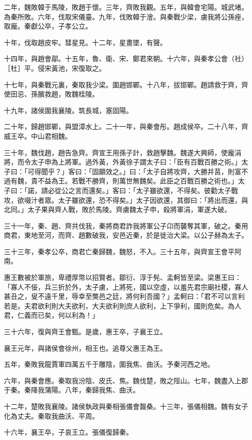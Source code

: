 \begin{pinyinscope}
二年，魏敗韓于馬陵，敗趙于懷。三年，齊敗我觀。五年，與韓會宅陽。城武堵。為秦所敗。六年，伐取宋儀臺。九年，伐敗韓于澮。與秦戰少梁，虜我將公孫痤，取龐。秦獻公卒，子孝公立。

十年，伐取趙皮牢。彗星見。十二年，星晝墜，有聲。

十四年，與趙會鄗。十五年，魯、衛、宋、鄭君來朝。十六年，與秦孝公會（社）［杜］平。侵宋黃池，宋復取之。

十七年，與秦戰元裏，秦取我少梁。圍趙邯鄲。十八年，拔邯鄲。趙請救于齊，齊使田忌、孫臏救趙，敗魏桂陵。

十九年，諸侯圍我襄陵。筑長城，塞固陽。

二十年，歸趙邯鄲，與盟漳水上。二十一年，與秦會彤。趙成侯卒。二十八年，齊威王卒。中山君相魏。

三十年，魏伐趙，趙告急齊。齊宣王用孫子計，救趙擊魏。魏遂大興師，使龐涓將，而令太子申為上將軍。過外黃，外黃徐子謂太子曰：「臣有百戰百勝之術。」太子曰：「可得聞乎？」客曰：「固願效之。」曰：「太子自將攻齊，大勝并莒，則富不過有魏，貴不益為王。若戰不勝齊，則萬世無魏矣。此臣之百戰百勝之術也。」太子曰：「諾，請必從公之言而還矣。」客曰：「太子雖欲還，不得矣。彼勸太子戰攻，欲啜汁者眾。太子雖欲還，恐不得矣。」太子因欲還，其御曰：「將出而還，與北同。」太子果與齊人戰，敗於馬陵。齊虜魏太子申，殺將軍涓，軍遂大破。

三十一年，秦、趙、齊共伐我，秦將商君詐我將軍公子卬而襲奪其軍，破之。秦用商君，東地至河，而齊、趙數破我，安邑近秦，於是徙治大梁。以公子赫為太子。

三十三年，秦孝公卒，商君亡秦歸魏，魏怒，不入。三十五年，與齊宣王會平阿南。

惠王數被於軍旅，卑禮厚幣以招賢者。鄒衍、淳于髡、孟軻皆至梁。梁惠王曰：「寡人不佞，兵三折於外，太子虜，上將死，國以空虛，以羞先君宗廟社稷，寡人甚丑之，叟不遠千里，辱幸至獘邑之廷，將何利吾國？」孟軻曰：「君不可以言利若是。夫君欲利則大夫欲利，大夫欲利則庶人欲利，上下爭利，國則危矣。為人君，仁義而已矣，何以利為！」

三十六年，復與齊王會甄。是歲，惠王卒，子襄王立。

襄王元年，與諸侯會徐州，相王也。追尊父惠王為王。

五年，秦敗我龍賈軍四萬五千于雕陰，圍我焦、曲沃。予秦河西之地。

六年，與秦會應。秦取我汾陰、皮氏、焦。魏伐楚，敗之陘山。七年，魏盡入上郡于秦。秦降我蒲陽。八年，秦歸我焦、曲沃。

十二年，楚敗我襄陵。諸侯執政與秦相張儀會齧桑。十三年，張儀相魏。魏有女子化為丈夫。秦取我曲沃、平周。

十六年，襄王卒，子哀王立。張儀復歸秦。


\end{pinyinscope}
